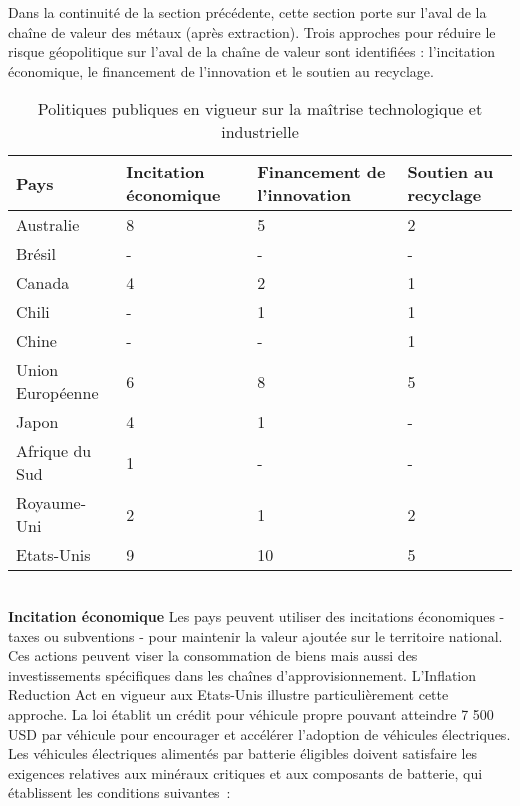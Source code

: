Dans la continuité de la section précédente, cette section porte sur l'aval de la chaîne de valeur des métaux (après extraction). Trois approches pour réduire le risque géopolitique sur l'aval de la chaîne de valeur sont identifiées : l'incitation économique, le financement de l'innovation et le soutien au recyclage.\\
\begin{table}[!h]
\centering
\begin{tabular}{ |p{3cm}||p{3.5cm}|p{3.5cm}|p{3.5cm}| }
 \hline
 Pays & Incitation économique & Financement de l'innovation & Soutien au recyclage\\
 \hline
 Australie          & 8     & 5 & 2 \\
 Brésil             & -     & - & - \\
 Canada             & 4     & 2 & 1 \\
 Chili              & -     & 1 & 1 \\
 Chine              & -     & - & 1 \\
 Union Européenne   & 6     & 8 & 5 \\
 Japon              & 4     & 1 & - \\
 Afrique du Sud     & 1     & - & - \\
 Royaume-Uni        & 2     & 1 & 2 \\
 Etats-Unis         & 9     & 10& 5 \\
 \hline
\end{tabular}
    \caption{Politiques publiques en vigueur sur la maîtrise technologique et industrielle}
    \label{tab:maitrise_techno}
\end{table}
~\\
\textbf{Incitation économique}\smallbreak
Les pays peuvent utiliser des incitations économiques - taxes ou subventions - pour maintenir la valeur ajoutée sur le territoire national. Ces actions peuvent viser la consommation de biens mais aussi des investissements spécifiques dans les chaînes d'approvisionnement.\smallbreak
L'Inflation Reduction Act en vigueur aux Etats-Unis illustre particulièrement cette approche.
La loi établit un crédit pour véhicule propre pouvant atteindre 7 500 USD par véhicule pour encourager et accélérer l'adoption de véhicules électriques. Les véhicules électriques alimentés par batterie éligibles doivent satisfaire les exigences relatives aux minéraux critiques et aux composants de batterie, qui établissent les conditions suivantes :
